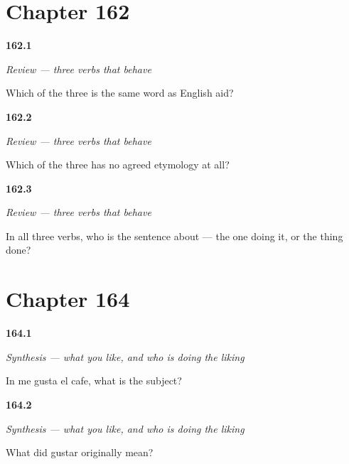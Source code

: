 \section*{Chapter 162}

\noindent\begin{minipage}[t]{\linewidth}
\raggedright
\hypertarget{review-ES-C35-repaso-tres-aid}{\textbf{162.1}} \emph{Review — three verbs that behave}\par
\small Which of the three is the same word as English aid?
\end{minipage}\par\medskip

\noindent\begin{minipage}[t]{\linewidth}
\raggedright
\hypertarget{review-ES-C35-repaso-tres-nostory}{\textbf{162.2}} \emph{Review — three verbs that behave}\par
\small Which of the three has no agreed etymology at all?
\end{minipage}\par\medskip

\noindent\begin{minipage}[t]{\linewidth}
\raggedright
\hypertarget{review-ES-C35-repaso-tres-who}{\textbf{162.3}} \emph{Review — three verbs that behave}\par
\small In all three verbs, who is the sentence about — the one doing it, or the thing done?
\end{minipage}\par\medskip

\section*{Chapter 164}

\noindent\begin{minipage}[t]{\linewidth}
\raggedright
\hypertarget{review-ES-C35-sintesis-gustar-subject}{\textbf{164.1}} \emph{Synthesis — what you like, and who is doing the liking}\par
\small In me gusta el cafe, what is the subject?
\end{minipage}\par\medskip

\noindent\begin{minipage}[t]{\linewidth}
\raggedright
\hypertarget{review-ES-C35-sintesis-gustar-taste}{\textbf{164.2}} \emph{Synthesis — what you like, and who is doing the liking}\par
\small What did gustar originally mean?
\end{minipage}\par\medskip

